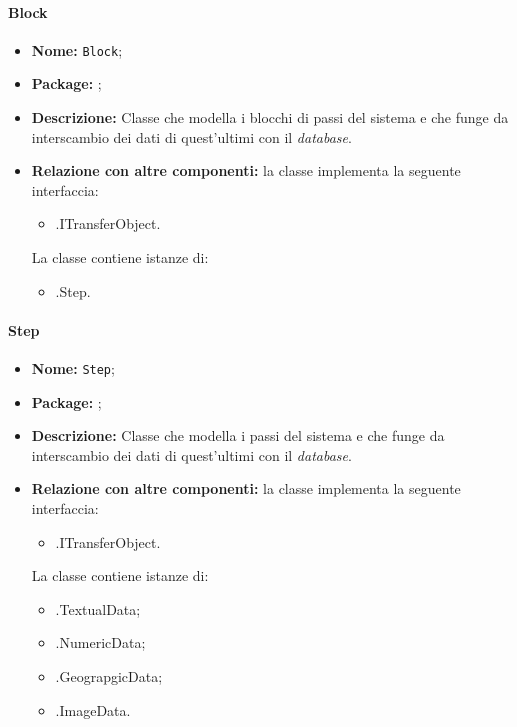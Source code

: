\paragraph{Block}
\begin{itemize}
\item \textbf{Nome:} \texttt{Block};
\item \textbf{Package:} \texttt{\smodel{}};
\item \textbf{Descrizione:} Classe che modella i blocchi di passi del sistema e che funge da interscambio dei dati di quest'ultimi con il \textit{database}.
\item \textbf{Relazione con altre componenti:} la classe implementa la seguente interfaccia:
		\begin{itemize}
			\item \smodel{}.ITransferObject.
		\end{itemize}
		La classe contiene istanze di:
		\begin{itemize}
			\item \smodel{}.Step.
		\end{itemize}
\end{itemize}

\paragraph{Step}
\begin{itemize}
\item \textbf{Nome:} \texttt{Step};
\item \textbf{Package:} \texttt{\smodel{}};
\item \textbf{Descrizione:} Classe che modella i passi del sistema e che funge da interscambio dei dati di quest'ultimi con il \textit{database}.
\item \textbf{Relazione con altre componenti:} la classe implementa la seguente interfaccia:
		\begin{itemize}
			\item \smodel{}.ITransferObject.
		\end{itemize}
		La classe contiene istanze di:
		\begin{itemize}
			\item \smodel{}.TextualData;
			\item \smodel{}.NumericData;
			\item \smodel{}.GeograpgicData;
			\item \smodel{}.ImageData.
		\end{itemize}
\end{itemize}

